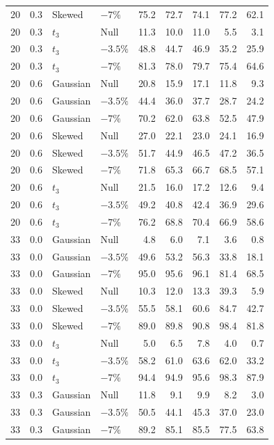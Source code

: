 \begin{longtable}{rrllrrrrr}
20 & 0.3 & Skewed & $-7\%$ & 75.2 & 72.7 & 74.1 & 77.2 & 62.1 \\
20 & 0.3 & $t_3$ & Null & 11.3 & 10.0 & 11.0 & 5.5 & 3.1 \\
20 & 0.3 & $t_3$ & $-3.5\%$ & 48.8 & 44.7 & 46.9 & 35.2 & 25.9 \\
20 & 0.3 & $t_3$ & $-7\%$ & 81.3 & 78.0 & 79.7 & 75.4 & 64.6 \\
20 & 0.6 & Gaussian & Null & 20.8 & 15.9 & 17.1 & 11.8 & 9.3 \\
20 & 0.6 & Gaussian & $-3.5\%$ & 44.4 & 36.0 & 37.7 & 28.7 & 24.2 \\
20 & 0.6 & Gaussian & $-7\%$ & 70.2 & 62.0 & 63.8 & 52.5 & 47.9 \\
20 & 0.6 & Skewed & Null & 27.0 & 22.1 & 23.0 & 24.1 & 16.9 \\
20 & 0.6 & Skewed & $-3.5\%$ & 51.7 & 44.9 & 46.5 & 47.2 & 36.5 \\
20 & 0.6 & Skewed & $-7\%$ & 71.8 & 65.3 & 66.7 & 68.5 & 57.1 \\
20 & 0.6 & $t_3$ & Null & 21.5 & 16.0 & 17.2 & 12.6 & 9.4 \\
20 & 0.6 & $t_3$ & $-3.5\%$ & 49.2 & 40.8 & 42.4 & 36.9 & 29.6 \\
20 & 0.6 & $t_3$ & $-7\%$ & 76.2 & 68.8 & 70.4 & 66.9 & 58.6 \\
33 & 0.0 & Gaussian & Null & 4.8 & 6.0 & 7.1 & 3.6 & 0.8 \\
33 & 0.0 & Gaussian & $-3.5\%$ & 49.6 & 53.2 & 56.3 & 33.8 & 18.1 \\
33 & 0.0 & Gaussian & $-7\%$ & 95.0 & 95.6 & 96.1 & 81.4 & 68.5 \\
33 & 0.0 & Skewed & Null & 10.3 & 12.0 & 13.3 & 39.3 & 5.9 \\
33 & 0.0 & Skewed & $-3.5\%$ & 55.5 & 58.1 & 60.6 & 84.7 & 42.7 \\
33 & 0.0 & Skewed & $-7\%$ & 89.0 & 89.8 & 90.8 & 98.4 & 81.8 \\
33 & 0.0 & $t_3$ & Null & 5.0 & 6.5 & 7.8 & 4.0 & 0.7 \\
33 & 0.0 & $t_3$ & $-3.5\%$ & 58.2 & 61.0 & 63.6 & 62.0 & 33.2 \\
33 & 0.0 & $t_3$ & $-7\%$ & 94.4 & 94.9 & 95.6 & 98.3 & 87.9 \\
33 & 0.3 & Gaussian & Null & 11.8 & 9.1 & 9.9 & 8.2 & 3.0 \\
33 & 0.3 & Gaussian & $-3.5\%$ & 50.5 & 44.1 & 45.3 & 37.0 & 23.0 \\
33 & 0.3 & Gaussian & $-7\%$ & 89.2 & 85.1 & 85.5 & 77.5 & 63.8 \\

\end{longtable}
